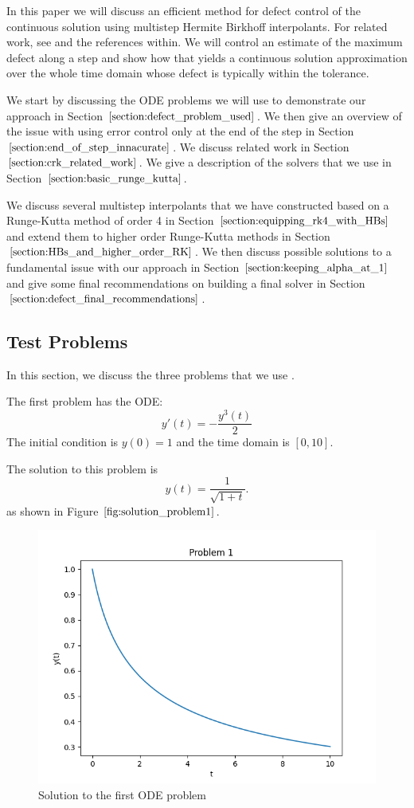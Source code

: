 In this paper we will discuss an efficient method for defect control of the continuous solution using multistep Hermite Birkhoff interpolants. For related work, see \cites{MR1239829}{tsitouras1990runge}{papageorgiou1997continuous} and the references within. We will control an estimate of the maximum defect along a step and show how that yields a continuous solution approximation over the whole time domain whose defect is typically within the tolerance.

We start by discussing the ODE problems we will use to demonstrate our approach in Section $\ref{section:defect_problem_used}$. We then give an overview of the issue with using error control only at the end of the step in Section $\ref{section:end_of_step_innacurate}$. We discuss related work in Section $\ref{section:crk_related_work}$. We give a description of the solvers that we use in Section $\ref{section:basic_runge_kutta}$. 

We discuss several multistep interpolants that we have constructed based on a Runge-Kutta method of order 4 in Section $\ref{section:equipping_rk4_with_HBs}$ and extend them to higher order Runge-Kutta methods in Section $\ref{section:HBs_and_higher_order_RK}$. We then discuss possible solutions to a fundamental issue with our approach in Section $\ref{section:keeping_alpha_at_1}$ and give some final recommendations on building a final solver in Section $\ref{section:defect_final_recommendations}$.

\subsection{Test Problems}
\label{section:defect_problem_used}
In this section, we discuss the three problems that we use \cite{MR1421071}. 

The first problem has the ODE:
\begin{equation}
y'(t) = - \frac{y^{3}(t)}{2} 
\end{equation}
The initial condition is $y(0) = 1$ and the time domain is $[0, 10]$.

The solution to this problem is
\begin{equation}
y(t) = \frac{1}{\sqrt{1 + t}}.
\end{equation}
as shown in Figure $\ref{fig:solution_problem1}$.

\begin{figure}[H]
\centering
\includegraphics[width=0.7\linewidth]{./figures/solution_problem1}
\caption{Solution to the first ODE problem}
\label{fig:solution_problem1}
\end{figure}

